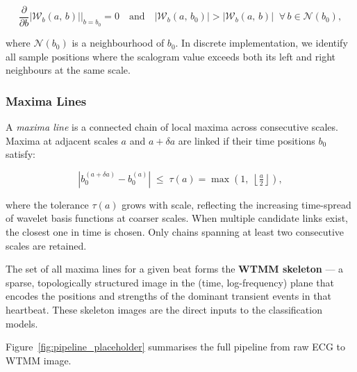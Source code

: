 \documentclass[12pt, a4paper]{article}
\newcommand{\abs}[1]{\left|#1\right|}
\newcommand{\CWT}{\mathcal{W}}
\begin{document}
\begin{mathbox}
\begin{equation}
  \frac{\partial}{\partial b}\abs{\CWT_b(a,\, b)}\bigg|_{b = b_0} = 0
  \quad \text{and} \quad
  \abs{\CWT_b(a,\, b_0)} > \abs{\CWT_b(a,\, b)}
  \;\; \forall\, b \in \mathcal{N}(b_0),
  \label{eq:wtmm_def}
\end{equation}
\end{mathbox}

\noindent where $\mathcal{N}(b_0)$ is a neighbourhood of $b_0$.
In discrete implementation, we identify all sample positions where the
scalogram value exceeds both its left and right neighbours at the same scale.

\subsubsection{Maxima Lines}

A \textit{maxima line} is a connected chain of local maxima across
consecutive scales. Maxima at adjacent scales $a$ and $a + \delta a$
are linked if their time positions $b_0$ satisfy:

\begin{mathbox}
\begin{equation}
  \abs{b_0^{(a+\delta a)} - b_0^{(a)}}
  \;\leq\;
  \tau(a) = \max\!\left(1,\;\left\lfloor \tfrac{a}{2} \right\rfloor\right),
  \label{eq:maxline_link}
\end{equation}
\end{mathbox}

\noindent where the tolerance $\tau(a)$ grows with scale, reflecting
the increasing time-spread of wavelet basis functions at coarser scales.
When multiple candidate links exist, the closest one in time is chosen.
Only chains spanning at least two consecutive scales are retained.

The set of all maxima lines for a given beat forms the
\textbf{WTMM skeleton} --- a sparse, topologically structured image in
the (time, log-frequency) plane that encodes the positions and strengths
of the dominant transient events in that heartbeat.
These skeleton images are the direct inputs to the classification models.

Figure~\ref{fig:pipeline_placeholder} summarises the full pipeline from
raw ECG to WTMM image.
\end{document}
